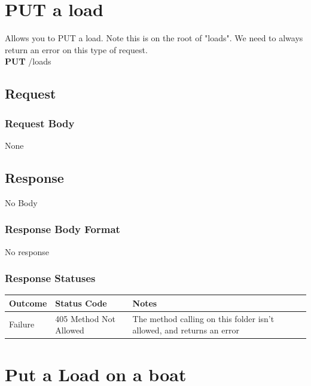 \documentclass[letterpaper,11pt,titlepage,draftclsnofoot,onecolumn,compsoc,utf8,latin1]{IEEEtran}
\begin{document}
\begin{singlespace}
\newpage 

\normalsize

\section{PUT a load}

Allows you to PUT a load. Note this is on the root of "loads". We need to always return an error on this type of request.\\

\noindent \textbf{PUT} /loads

\subsection{Request}

\subsubsection{Request Body}

None

\subsection{Response}

No Body

\subsubsection{Response Body Format}

No response

\subsubsection{Response Statuses}

\begin{center}
\begin{tabular}{ |p{}|p{}|p{}| } 
 \hline
 \textbf{Outcome} & \textbf{Status Code} & \textbf{Notes}  \\  \hline
 Failure & 405 Method Not Allowed & The method calling on this folder isn't allowed, and returns an error \\
 \hline
\end{tabular}
\end{center}

\newpage


\normalsize

\section{Put a Load on a boat}


\end{singlespace}
\end{document}
